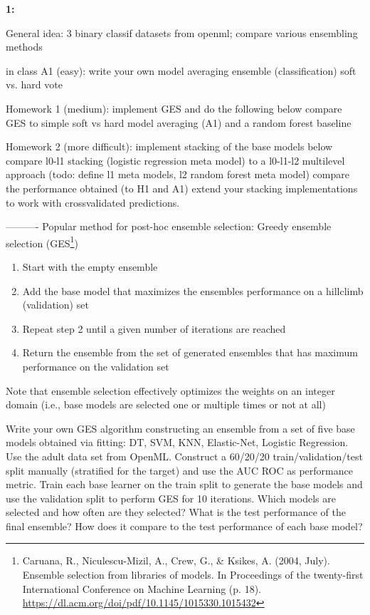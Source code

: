 \textbf{1:}\\ \noindent
\vspace{0.1cm}

General idea:
3 binary classif datasets from openml; compare various ensembling methods


in class A1 (easy):
write your own model averaging ensemble (classification)
soft vs. hard vote

Homework 1 (medium):
implement GES and do the following below
compare GES to simple soft vs hard model averaging (A1) and a random forest baseline

Homework 2 (more difficult):
implement stacking of the base models below
compare l0-l1 stacking (logistic regression meta model) to a l0-l1-l2 multilevel approach (todo: define l1 meta models, l2 random forest meta model)
compare the performance obtained (to H1 and A1)
extend your stacking implementations to work with crossvalidated predictions.

----------
Popular method for post-hoc ensemble selection: Greedy ensemble selection (GES\footnote{Caruana, R., Niculescu-Mizil, A., Crew, G., \& Ksikes, A. (2004, July). Ensemble selection from libraries of models. In Proceedings of the twenty-first International Conference on Machine Learning (p. 18). \url{https://dl.acm.org/doi/pdf/10.1145/1015330.1015432}})
\begin{enumerate}
    \item Start with the empty ensemble
    \item Add the base model that maximizes the ensembles performance on a hillclimb (validation) set
    \item Repeat step 2 until a given number of iterations are reached
    \item Return the ensemble from the set of generated ensembles that has maximum performance on the validation set
\end{enumerate}
Note that ensemble selection effectively optimizes the weights on an integer domain (i.e., base models are selected one or multiple times or not at all)

Write your own GES algorithm constructing an ensemble from a set of five base models obtained via fitting: DT, SVM, KNN, Elastic-Net, Logistic Regression.
Use the adult data set from OpenML.
Construct a 60/20/20 train/validation/test split manually (stratified for the target) and use the AUC ROC as performance metric.
Train each base learner on the train split to generate the base models and use the validation split to perform GES for 10 iterations. Which models are selected and how often are they selected?
What is the test performance of the final ensemble?
How does it compare to the test performance of each base model?
